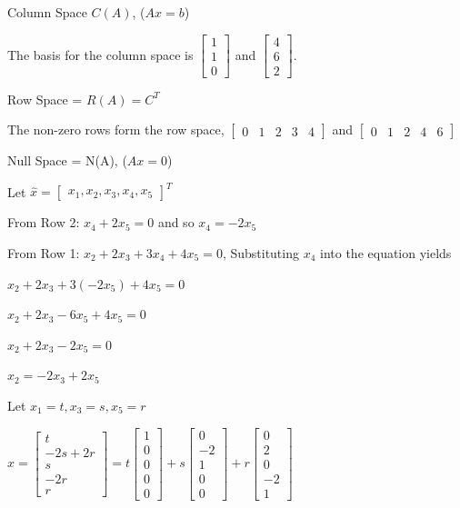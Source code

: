 \documentclass{article}
\begin{document}
Column Space $C(A)$, ($Ax = b$)

The basis for the column space is $\begin{bmatrix}
    1 \\ 1 \\ 0
\end{bmatrix}$ and $\begin{bmatrix}
    4 \\ 6 \\ 2
\end{bmatrix}$.

Row Space = $R(A) = C^T$

The non-zero rows form the row space, $\begin{bmatrix}
    0 & 1 & 2 & 3 & 4
\end{bmatrix}$ and $\begin{bmatrix}
    0 & 1 & 2 & 4 & 6
\end{bmatrix}$

Null Space = N(A), ($Ax = 0$)

Let $\hat{x} = \begin{bmatrix}
    x_1, x_2, x_3, x_4, x_5
\end{bmatrix}^T$

From Row 2: $x_4 + 2x_5 = 0$ and so $x_4 = -2x_5$

From Row 1: $x_2 + 2x_3 + 3x_4 + 4x_5 = 0$, Substituting $x_4$ into the equation yields 

$x_2 + 2x_3 + 3(-2x_5) + 4x_5 = 0$

$x_2 + 2x_3 - 6x_5 + 4x_5 = 0$

$x_2 + 2x_3 - 2x_5 = 0$

$x_2 = -2x_3 + 2x_5$

Let $x_1 = t, x_3 = s, x_5 = r$

$\hat{x} = \begin{bmatrix}
    t \\ -2s + 2r \\ s \\ -2r \\ r
\end{bmatrix} = t\begin{bmatrix}
    1 \\ 0 \\ 0 \\ 0 \\ 0
\end{bmatrix} + s\begin{bmatrix}
    0 \\ -2 \\ 1 \\ 0 \\ 0
\end{bmatrix} + r\begin{bmatrix}
    0 \\ 2 \\ 0 \\ -2 \\ 1
\end{bmatrix}$
\end{document}
